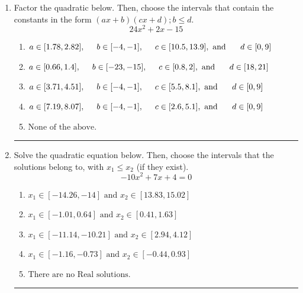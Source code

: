\documentclass[14pt]{extbook}
\newcommand{\litem}[1]{\item#1\hspace*{-1cm}\rule{\textwidth}{0.4pt}}
\begin{document}
\begin{enumerate}
{\begin{enumerate}[label=\Alph*.]
\end{enumerate} }
\litem{
Factor the quadratic below. Then, choose the intervals that contain the constants in the form $(ax+b)(cx+d); b \leq d.$\[ 24x^{2} +2 x -15 \]\begin{enumerate}[label=\Alph*.]
\item \( a \in [1.78, 2.82], \hspace*{5mm} b \in [-4, -1], \hspace*{5mm} c \in [10.5, 13.9], \text{ and } \hspace*{5mm} d \in [0, 9] \)
\item \( a \in [0.66, 1.4], \hspace*{5mm} b \in [-23, -15], \hspace*{5mm} c \in [0.8, 2], \text{ and } \hspace*{5mm} d \in [18, 21] \)
\item \( a \in [3.71, 4.51], \hspace*{5mm} b \in [-4, -1], \hspace*{5mm} c \in [5.5, 8.1], \text{ and } \hspace*{5mm} d \in [0, 9] \)
\item \( a \in [7.19, 8.07], \hspace*{5mm} b \in [-4, -1], \hspace*{5mm} c \in [2.6, 5.1], \text{ and } \hspace*{5mm} d \in [0, 9] \)
\item \( \text{None of the above.} \)

\end{enumerate} }
\litem{
Solve the quadratic equation below. Then, choose the intervals that the solutions belong to, with $x_1 \leq x_2$ (if they exist).\[ -10x^{2} +7 x + 4 = 0 \]\begin{enumerate}[label=\Alph*.]
\item \( x_1 \in [-14.26, -14] \text{ and } x_2 \in [13.83, 15.02] \)
\item \( x_1 \in [-1.01, 0.64] \text{ and } x_2 \in [0.41, 1.63] \)
\item \( x_1 \in [-11.14, -10.21] \text{ and } x_2 \in [2.94, 4.12] \)
\item \( x_1 \in [-1.16, -0.73] \text{ and } x_2 \in [-0.44, 0.93] \)
\item \( \text{There are no Real solutions.} \)


\end{enumerate}}
\end{enumerate}
\end{document}
